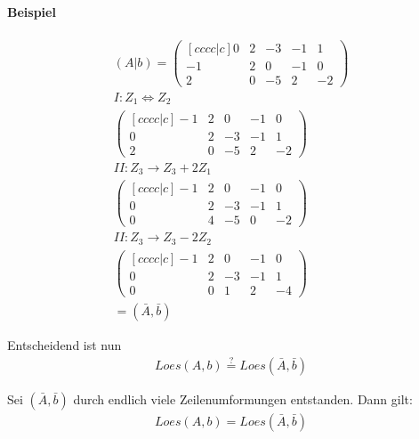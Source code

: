 \documentclass[11pt]{report}
\begin{document}
\paragraph{Beispiel}
\begin{align}
 (A | b) = 
\begin{pmatrix}[cccc|c]
 0 & 2 & -3 & -1 & 1 \\
 -1 & 2 & 0 & -1 & 0 \\
 2 & 0 & -5 & 2 & -2
\end{pmatrix} \\
I: Z_1 \Leftrightarrow Z_2 \\
\begin{pmatrix}[cccc|c]
 -1 & 2 & 0 & -1 & 0 \\
 0 & 2 & -3 & -1 & 1 \\
 2 & 0 & -5 & 2 & -2
\end{pmatrix} \\
II: Z_3 \rightarrow Z_3 + 2Z_1 \\
\begin{pmatrix}[cccc|c]
 -1 & 2 & 0 & -1 & 0 \\
 0 & 2 & -3 & -1 & 1 \\
 0 & 4 & -5 & 0 & -2
\end{pmatrix} \\
II: Z_3 \rightarrow Z_3 - 2Z_2 \\
\begin{pmatrix}[cccc|c]
 -1 & 2 & 0 & -1 & 0 \\
 0 & 2 & -3 & -1 & 1 \\
 0 & 0 & 1 & 2 & -4
\end{pmatrix} \\
= (\bar{A},\bar{b})
\end{align}

Entscheidend ist nun
\begin{align}
 Loes(A, b) \stackrel{?}{=} Loes(\bar{A}, \bar{b})
\end{align}

\begin{lemma}
 \label{lemma131}
Sei $(\bar{A}, \bar{b})$ durch endlich viele Zeilenumformungen entstanden. Dann gilt:
\begin{align}
 Loes(A, b) = Loes(\bar{A}, \bar{b}) 
\end{align}
\end{lemma}
\end{document}
